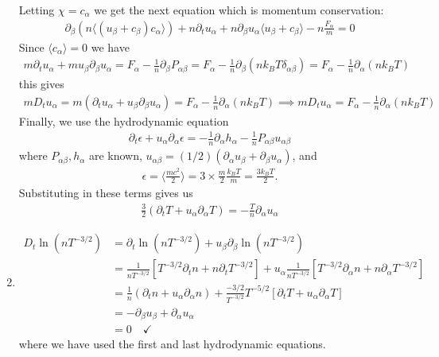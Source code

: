 \documentclass{article}
\theoremstyle{definition}
\newcommand{\p}{\partial}
\newcommand{\al}{\alpha}
\newcommand{\be}{\beta}
\newcommand{\f}[2]{\frac{#1}{#2}}
\newcommand{\lp}{\left(}
\newcommand{\rp}{\right)}
\newcommand{\lb}{\left[}
\newcommand{\rb}{\right]}
\begin{document}
\begin{enumerate}[label=(\alph*)]
	Letting $\chi = c_\al$ we get the next equation which is momentum conservation:
	\begin{align*}
	\p_\be (n\langle (u_\be + c_\be)c_\al \rangle ) + n\p_t u_\al + n\p_\be u_\al \langle u_\be + c_\be \rangle - n\f{F_\al}{m} = 0
	\end{align*}
	Since $\langle c_\al \rangle = 0$ we have
	\begin{align*}
	m\p_t u_\al + mu_\be \p_\be u_\al = {F_\al} - \f{1}{n}\p_\be P_{\al\be} = {F_\al} - \f{1}{n}\p_\be (nk_B T\delta_{\al\be}) = {F_\al} - \f{1}{n}\p_\al (nk_B T)
	\end{align*}
	this gives
	\begin{align*}
	mD_t u_\al = m(\p_t u_\al + u_\be \p_\be u_\al) = F_\al - \f{1}{n}\p_\al(nk_B T) \implies \boxed{mD_t u_\al = F_\al - \f{1}{n}\p_\al(n k_B T)} 
	\end{align*}
	Finally, we use the hydrodynamic equation
	\begin{align*}
	\p_t \epsilon + u_\al \p_\al \epsilon = -\f{1}{n}\p_\al h_\al - \f{1}{n}P_{\al\be} u_{\al\be}
	\end{align*}
	where $P_{\al\be},h_\al$ are known, $u_{\al\be} = (1/2)(\p_\al u_\be + \p_\be u_\al)$, and 
	\begin{align*}
	\epsilon = \langle \f{mc^2}{2}  \rangle  = 3\times \f{m}{2}\f{k_BT}{m} = \f{3k_BT}{2}.
	\end{align*}
	Substituting in these terms gives us 
	\begin{align*}
	\boxed{\f{3}{2}\lp \p_t T + u_\al \p_\al T\rp = -\f{T}{n}\p_\al u_\al} 
	\end{align*}
	
	\item 
	\begin{align*}
	D_t \ln\lp nT^{-3/2} \rp 
	&= \p_t \ln\lp nT^{-3/2}\rp + u_\be \p_\be \ln\lp nT^{-3/2} \rp \\
	&= \f{1}{nT^{-3/2}}\lb T^{-3/2}\p_t n + n\p_t T^{-3/2} \rb + u_\al \f{1}{nT^{-3/2}}\lb T^{-3/2}\p_\al n + n\p_\al T^{-3/2} \rb \\
	&= \f{1}{n}(\p_t n + u_\al \p_\al n) + \f{-3/2}{T^{-3/2}}T^{-5/2}\lb \p_t T + u_\al \p_\al T \rb \\
	&= -\p_\be u_\be + \p_\al u_\al \\
	&= 0 \quad \checkmark
	\end{align*}
	where we have used the first and last hydrodynamic equations.
	

\end{enumerate}
\end{document}
